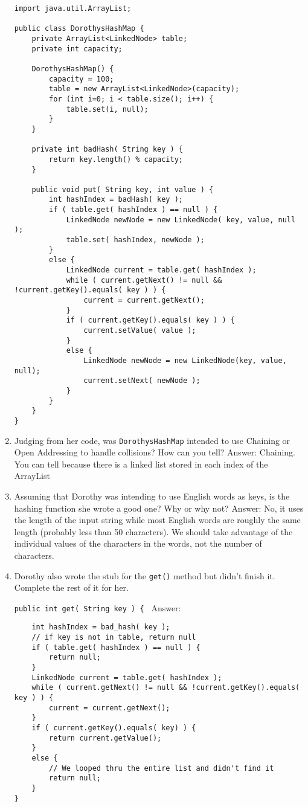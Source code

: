 \documentclass[11pt]{article}
\newenvironment{answer}{\large\lstset{basicstyle=\large}\color{white} \small{Answer:}\large}{}
\newenvironment{answer}{\large\lstset{basicstyle=\large}\color{red} \small{Answer:}\large}{}
\begin{document}
\begin{enumerate}
\begin{lstlisting}
import java.util.ArrayList;

public class DorothysHashMap {
	private ArrayList<LinkedNode> table;
	private int capacity;
    
	DorothysHashMap() {
		capacity = 100;
		table = new ArrayList<LinkedNode>(capacity);
		for (int i=0; i < table.size(); i++) {
			table.set(i, null);
		}
	}
    
	private int badHash( String key ) {
		return key.length() % capacity;
	}
    
	public void put( String key, int value ) {
		int hashIndex = badHash( key );
		if ( table.get( hashIndex ) == null ) {
			LinkedNode newNode = new LinkedNode( key, value, null );
			table.set( hashIndex, newNode );
		}
		else {
			LinkedNode current = table.get( hashIndex );
			while ( current.getNext() != null && !current.getKey().equals( key ) ) {
				current = current.getNext();
			}
			if ( current.getKey().equals( key ) ) {
				current.setValue( value );
			}
			else {
				LinkedNode newNode = new LinkedNode(key, value, null);
				current.setNext( newNode );
			}
		}
	}
}
\end{lstlisting}
	
\item Judging from her code, was {\tt DorothysHashMap} intended to use Chaining or Open Addressing to handle collisions? How can you tell?
	\begin{answer}
	Chaining. You can tell because there is a linked list stored in each index of the ArrayList
	\end{answer}

\item Assuming that Dorothy was intending to use English words as keys, is the hashing function she wrote a good one? Why or why not?
	\begin{answer}
	No, it uses the length of the input string while most English words are roughly the same length (probably less than 50 characters). We should take advantage of the individual values of the characters in the words, not the number of characters. 
	\end{answer}

\item Dorothy also wrote the stub for the {\tt get()} method but didn't finish it. Complete the rest of it for her.

{\tt public int get( String key ) \{ }
\begin{answer} 
\begin{lstlisting}
	int hashIndex = bad_hash( key );
	// if key is not in table, return null
	if ( table.get( hashIndex ) == null ) {
		return null;
	}
	LinkedNode current = table.get( hashIndex );
	while ( current.getNext() != null && !current.getKey().equals( key ) ) {
		current = current.getNext();
	}
	if ( current.getKey().equals( key) ) {
		return current.getValue();
	}
	else {
		// We looped thru the entire list and didn't find it
		return null;
	}
}
\end{lstlisting}
\end{answer}




\end{enumerate}
\end{document}
